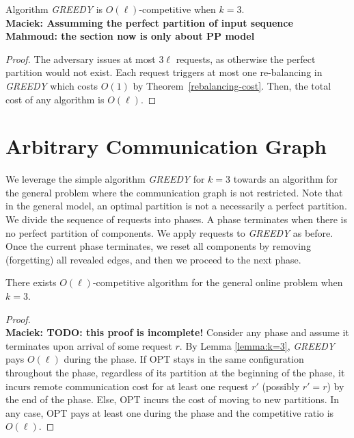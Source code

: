 \documentclass[manuscript,screen=true]{acmart}
\newcommand\mahmoud[1]{\color{green}\textbf{\\ Mahmoud: #1}\\\color{black}}
\newcommand\maciek[1]{\color{brown}\textbf{\\ Maciek: #1}\color{black}}
\begin{document}
\begin{appendix}
    
  \begin{theorem}
    Algorithm \emph{GREEDY} is $O(\ell)$-competitive when $k=3$.
    \maciek{Assumming the perfect partition of input sequence
    \mahmoud{the section now is only about PP model}}
  \end{theorem}
  
  \begin{proof}
    The adversary issues at most $3\ell$ requests, as otherwise the perfect partition would not exist.
    Each request triggers at most one re-balancing in \emph{GREEDY}
    which costs $O(1)$ by Theorem~\ref{rebalancing-cost}.
    Then,
    the total cost of any algorithm is $O(\ell)$.
  \end{proof}
  
  \section{Arbitrary Communication Graph} \label{sec:generalModel}
  
  We leverage the simple algorithm \emph{GREEDY} for $k=3$
  towards an algorithm for the general problem
  where the communication graph is not restricted.
  Note that in the general model,
  an optimal partition is not a necessarily a perfect partition.
  We divide the sequence of requests into phases.
  A phase terminates when there is no perfect partition of components.
  We apply requests to \emph{GREEDY} as before. 
  Once the current phase terminates,
  we reset all components by removing (forgetting) all revealed edges,
  and then we proceed to the next phase.
  
  \begin{theorem} \label{cor:k=3}
    There exists $O(\ell)$-competitive algorithm for the general online problem when $k=3$. 
  \end{theorem}
  \begin{proof}
    \maciek{TODO: this proof is incomplete!}
    Consider any phase and assume it terminates upon arrival of some request $r$.
    By Lemma  \ref{lemma:k=3},
    \emph{GREEDY} pays $O(\ell)$ during the phase.
    If OPT stays in the same configuration throughout the phase,
    regardless of its partition at the beginning of the phase,        
    it incurs remote communication cost for at least one request $r'$ (possibly $r'=r$) by the end of the phase.
    Else,
    OPT incurs the cost of moving to new partitions.
    In any case,
    OPT pays at least one during the phase and 
    the competitive ratio is $O(\ell)$.
  \end{proof}
  
  

\end{appendix}
\end{document}
